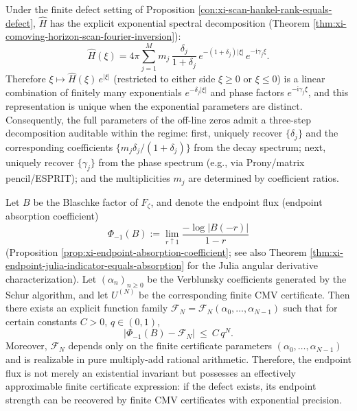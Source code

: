 \begin{proposition}\label{con:xi-scan-exponential-spectrum-separation}
Under the finite defect setting of Proposition \ref{con:xi-scan-hankel-rank-equals-defect}, \(\widehat H\) has the explicit exponential spectral decomposition (Theorem \ref{thm:xi-comoving-horizon-scan-fourier-inversion}):
\[
\widehat H(\xi)
=4\pi\sum_{j=1}^{M} m_j\,\frac{\delta_j}{1+\delta_j}\,
e^{-(1+\delta_j)|\xi|}\,e^{-\mathrm{i}\gamma_j\xi}.
\]
Therefore \( \xi\mapsto \widehat H(\xi)\,e^{|\xi|}\) (restricted to either side \(\xi\ge 0\) or \(\xi\le 0\)) is a linear combination of finitely many exponentials \(e^{-\delta_j|\xi|}\) and phase factors \(e^{-\mathrm{i}\gamma_j\xi}\), and this representation is unique when the exponential parameters are distinct.
Consequently, the full parameters of the off-line zeros admit a three-step decomposition auditable within the regime: first, uniquely recover \(\{\delta_j\}\) and the corresponding coefficients \(\{m_j\delta_j/(1+\delta_j)\}\) from the decay spectrum; next, uniquely recover \(\{\gamma_j\}\) from the phase spectrum (e.g., via Prony/matrix pencil/ESPRIT); and the multiplicities \(m_j\) are determined by coefficient ratios.
\end{proposition}

\begin{proposition}\label{con:xi-endpoint-flux-computable-by-finite-cmv}
Let \(B\) be the Blaschke factor of \(F_{\zeta}\), and denote the endpoint flux (endpoint absorption coefficient)
\[
\Phi_{-1}(B):=\lim_{r\uparrow 1}\frac{-\log|B(-r)|}{1-r}
\]
(Proposition \ref{prop:xi-endpoint-absorption-coefficient}; see also Theorem \ref{thm:xi-endpoint-julia-indicator-equals-absorption} for the Julia angular derivative characterization).
Let \((\alpha_n)_{n\ge 0}\) be the Verblunsky coefficients generated by the Schur algorithm, and let \(U^{(N)}\) be the corresponding finite CMV certificate.
Then there exists an explicit function family \(\mathcal{F}_N=\mathcal{F}_N(\alpha_0,\dots,\alpha_{N-1})\) such that for certain constants \(C>0\), \(q\in(0,1)\),
\[
\bigl|\Phi_{-1}(B)-\mathcal{F}_N\bigr|\ \le\ C\,q^N.
\]
Moreover, \(\mathcal{F}_N\) depends only on the finite certificate parameters \((\alpha_0,\dots,\alpha_{N-1})\) and is realizable in pure multiply-add rational arithmetic.
Therefore, the endpoint flux is not merely an existential invariant but possesses an effectively approximable finite certificate expression: if the defect exists, its endpoint strength can be recovered by finite CMV certificates with exponential precision.
\end{proposition}

